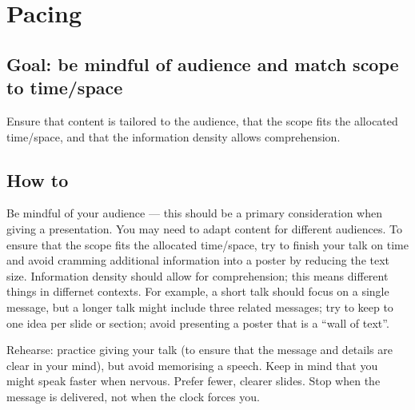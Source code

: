 \documentclass[
  a4paper,
  DIV=11,
  numbers=noendperiod,
  oneside]{scrreprt}
\begin{document}
\section{Pacing}\label{sec-pres-pacing}

\subsection{Goal: be mindful of audience and match scope to
time/space}\label{goal-be-mindful-of-audience-and-match-scope-to-timespace}

Ensure that content is tailored to the audience, that the scope fits the
allocated time/space, and that the information density allows
comprehension.

\subsection{How to}\label{how-to-10}

Be mindful of your audience --- this should be a primary consideration
when giving a presentation. You may need to adapt content for different
audiences. To ensure that the scope fits the allocated time/space, try
to finish your talk on time and avoid cramming additional information
into a poster by reducing the text size. Information density should
allow for comprehension; this means different things in differnet
contexts. For example, a short talk should focus on a single message,
but a longer talk might include three related messages; try to keep to
one idea per slide or section; avoid presenting a poster that is a
``wall of text''.

\begin{tcolorbox}[enhanced jigsaw, colframe=quarto-callout-note-color-frame, title=\textcolor{quarto-callout-note-color}{\faInfo}\hspace{0.5em}{Talk Pacing}, breakable, opacityback=0, titlerule=0mm, colbacktitle=quarto-callout-note-color!10!white, toptitle=1mm, colback=white, coltitle=black, toprule=.15mm, bottomtitle=1mm, left=2mm, arc=.35mm, rightrule=.15mm, bottomrule=.15mm, opacitybacktitle=0.6, leftrule=.75mm]

Rehearse: practice giving your talk (to ensure that the message and
details are clear in your mind), but avoid memorising a speech. Keep in
mind that you might speak faster when nervous. Prefer fewer, clearer
slides. Stop when the message is delivered, not when the clock forces
you.

\end{tcolorbox}
\end{document}
